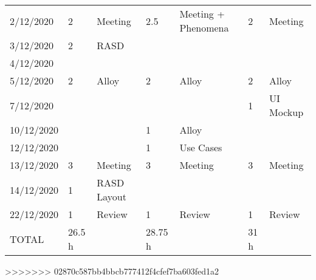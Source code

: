 \begin{table}[h]
{\begin{tabular}{|l|l|p{2.5cm}|l|p{2.5cm}|l|p{2.5cm}|}
2/12/2020& 2& Meeting& 2.5& Meeting + Phenomena& 2& Meeting\\
3/12/2020& 2& RASD &&&&\\
4/12/2020&&&&&&\\
5/12/2020& 2& Alloy& 2& Alloy& 2& Alloy\\
7/12/2020&&&&& 1& UI Mockup\\
10/12/2020&&& 1& Alloy&&\\
12/12/2020&&& 1& Use Cases&&\\
13/12/2020& 3& Meeting& 3& Meeting& 3& Meeting\\
14/12/2020& 1& RASD Layout&&&&\\
22/12/2020& 1& Review& 1& Review& 1& Review\\
\hline
TOTAL& 26.5 h&& 28.75 h && 31 h&\\
\hline
\end{tabular}
}
\end{table}
>>>>>>> 02870c587bb4bbcb777412f4cfef7ba603fed1a2

